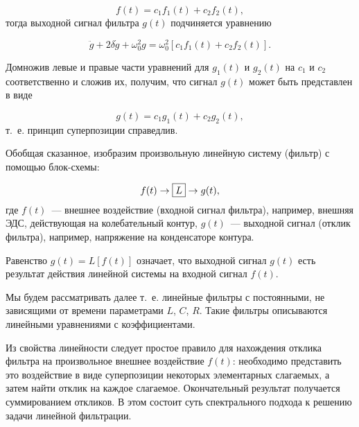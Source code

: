 \begin{equation*}
	f(t)=c_1f_1(t)+c_2f_2(t),
\end{equation*}
тогда выходной сигнал фильтра $g(t)$ подчиняется уравнению

\begin{equation*}
	\ddot{g}+2\delta\dot{g}+\omega_0^2g=\omega_0^2[c_1f_1(t)+c_2f_2(t)].
\end{equation*}

Домножив левые и правые части уравнений для $g_1(t)$ и $g_2(t)$ на $c_1$ и $c_2$ соответственно и сложив их, получим,
что сигнал $g(t)$ может быть представлен в виде

\begin{equation*}
	g(t)=c_1g_1(t)+c_2g_2(t),
\end{equation*}
т.~е. принцип суперпозиции справедлив.

Обобщая сказанное, изобразим произвольную линейную систему (фильтр) с помощью блок-схемы:

\begin{equation*}
	f(t)\to\fbox{$L$} \to g(t),
\end{equation*}
где $f(t)$~--- внешнее воздействие (входной сигнал фильтра), например, внешняя ЭДС, действующая на колебательный контур,
$g(t)$~--- выходной сигнал (отклик фильтра), например, напряжение на конденсаторе контура.

Равенство $g(t)=L[f(t)]$ означает, что выходной сигнал $g(t)$ есть результат действия линейной системы на входной сигнал $f(t)$. 


Мы будем рассматривать далее  т.~е. линейные фильтры с постоянными, не зависящими от
времени параметрами $L$, $C$, $R$. Такие фильтры описываются линейными уравнениями с  коэффициентами.

Из свойства линейности следует простое правило для нахождения отклика фильтра на произвольное внешнее воздействие $f(t)$:
необходимо представить это воздействие в виде суперпозиции некоторых элементарных слагаемых, а затем найти отклик на
каждое слагаемое. Окончательный результат получается суммированием откликов. В этом состоит суть спектрального подхода к
решению задачи линейной фильтрации.

